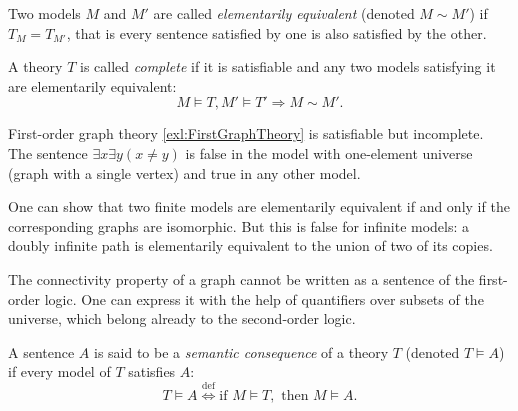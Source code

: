 \begin{page}

\begin{dfn}
Two models $M$ and $M'$ are called \emph{elementarily equivalent} (denoted $M \sim M'$) if $T_M = T_{M'}$, that is
every sentence satisfied by one is also satisfied by the other.
\end{dfn}

\end{page}

\begin{page}

\begin{dfn}
A theory $T$ is called \emph{complete} if it is satisfiable and any two models satisfying it are elementarily equivalent:
\[
M \vDash T, M' \vDash T' \Rightarrow M \sim M'.
\]
\end{dfn}

\end{page}

\begin{page}

\begin{exl}
First-order graph theory \ref{exl:FirstGraphTheory} is satisfiable but incomplete.
The sentence $\exists x \exists y (x \ne y)$ is false in the model with one-element universe (graph with a single vertex) and true in any other model.
\end{exl}

\end{page}

\begin{page}

\begin{rem}
One can show that two finite models are elementarily equivalent if and only if the corresponding graphs are isomorphic.
But this is false for infinite models: a doubly infinite path is elementarily equivalent to the union of two of its copies.

The connectivity property of a graph cannot be written as a sentence of the first-order logic.
One can express it with the help of quantifiers over subsets of the universe, which belong already to the second-order logic.
\end{rem}

\end{page}

\begin{page}

\begin{dfn}
A sentence $A$ is said to be a \emph{semantic consequence} of a theory $T$ (denoted $T \vDash A$) if every model of $T$ satisfies $A$:
\[
T \vDash A \stackrel{\mathrm{def}}{\Longleftrightarrow} \text{if } M \vDash T, \text{ then } M \vDash A.
\]
\end{dfn}

\end{page}

